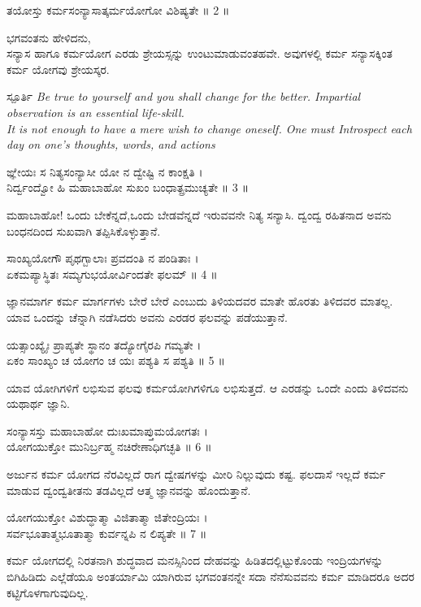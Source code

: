 ತಯೋಸ್ತು ಕರ್ಮಸಂನ್ಯಾಸಾತ್ಕರ್ಮಯೋಗೋ ವಿಶಿಷ್ಯತೇ ॥ 2 ॥
\begin{quoting}
ಭಗವಂತನು ಹೇಳಿದನು,\\
ಸನ್ಯಾಸ ಹಾಗೂ ಕರ್ಮಯೋಗ ಎರಡು ಶ್ರೇಯಸ್ಸನ್ನು ಉಂಟುಮಾಡುವಂತಹವೇ. ಅವುಗಳಲ್ಲಿ ಕರ್ಮ ಸನ್ಯಾಸಕ್ಕಿಂತ ಕರ್ಮ ಯೋಗವು ಶ್ರೇಯಸ್ಕರ.\\
\begin{inspiration}{\kanfont ಸ್ಪೂರ್ತಿ}
\small\it
Be true to yourself and you shall change for the better. Impartial observation is an essential life-skill.\\
It is not enough to have a mere wish to change oneself. One must Introspect each day on one’s thoughts, words, and actions
\end{inspiration}
\end{quoting}
ಙ್ಞೇಯಃ ಸ ನಿತ್ಯಸಂನ್ಯಾಸೀ ಯೋ ನ ದ್ವೇಷ್ಟಿ ನ ಕಾಂಕ್ಷತಿ ।\\
ನಿರ್ದ್ವಂದ್ವೋ ಹಿ ಮಹಾಬಾಹೋ ಸುಖಂ ಬಂಧಾತ್ಪ್ರಮುಚ್ಯತೇ ॥ 3 ॥
\begin{quoting}
ಮಹಾಬಾಹೋ! ಒಂದು ಬೇಕೆನ್ನದೆ,ಒಂದು ಬೇಡವೆನ್ನದೆ ಇರುವವನೇ ನಿತ್ಯ ಸನ್ಯಾಸಿ. ದ್ವಂದ್ವ ರಹಿತನಾದ ಅವನು ಬಂಧನದಿಂದ ಸುಖವಾಗಿ ತಪ್ಪಿಸಿಕೊಳ್ಳುತ್ತಾನೆ.\\
\end{quoting}
ಸಾಂಖ್ಯಯೋಗೌ ಪೃಥಗ್ಬಾಲಾಃ ಪ್ರವದಂತಿ ನ ಪಂಡಿತಾಃ ।\\
ಏಕಮಪ್ಯಾಸ್ಥಿತಃ ಸಮ್ಯಗುಭಯೋರ್ವಿಂದತೇ ಫಲಮ್ ॥ 4 ॥
\begin{quoting}
ಜ್ಞಾನಮಾರ್ಗ ಕರ್ಮ ಮಾರ್ಗಗಳು ಬೇರೆ ಬೇರೆ ಎಂಬುದು ತಿಳಿಯದವರ ಮಾತೇ ಹೊರತು ತಿಳಿದವರ ಮಾತಲ್ಲ. ಯಾವ ಒಂದನ್ನು ಚೆನ್ನಾಗಿ ನಡೆಸಿದರು ಅವನು ಎರಡರ ಫಲವನ್ನು ಪಡೆಯುತ್ತಾನೆ.\\
\end{quoting}
ಯತ್ಸಾಂಖ್ಯೈಃ ಪ್ರಾಪ್ಯತೇ ಸ್ಥಾನಂ ತದ್ಯೋಗೈರಪಿ ಗಮ್ಯತೇ ।\\
ಏಕಂ ಸಾಂಖ್ಯಂ ಚ ಯೋಗಂ ಚ ಯಃ ಪಶ್ಯತಿ ಸ ಪಶ್ಯತಿ ॥ 5 ॥
\begin{quoting}
ಯಾವ ಯೋಗಿಗಳಿಗೆ ಲಭಿಸುವ ಫಲವು ಕರ್ಮಯೋಗಿಗಳಿಗೂ ಲಭಿಸುತ್ತದೆ. ಆ ಎರಡನ್ನು ಒಂದೇ ಎಂದು ತಿಳಿದವನು ಯಥಾರ್ಥ ಜ್ಞಾನಿ.\\
\end{quoting}
ಸಂನ್ಯಾಸಸ್ತು ಮಹಾಬಾಹೋ ದುಃಖಮಾಪ್ತುಮಯೋಗತಃ ।\\
ಯೋಗಯುಕ್ತೋ ಮುನಿರ್ಬ್ರಹ್ಮ ನಚಿರೇಣಾಧಿಗಚ್ಛತಿ ॥ 6 ॥
\begin{quoting}
ಅರ್ಜುನ ಕರ್ಮ ಯೋಗದ ನೆರವಿಲ್ಲದೆ ರಾಗ ದ್ವೇಷಗಳನ್ನು ಮೀರಿ ನಿಲ್ಲುವುದು ಕಷ್ಟ. ಫಲದಾಸೆ ಇಲ್ಲದೆ ಕರ್ಮ ಮಾಡುವ ದ್ವಂದ್ವತೀತನು ತಡವಿಲ್ಲದೆ ಆತ್ಮ ಜ್ಞಾನವನ್ನು ಹೊಂದುತ್ತಾನೆ.\\
\end{quoting}
ಯೋಗಯುಕ್ತೋ ವಿಶುದ್ಧಾತ್ಮಾ ವಿಜಿತಾತ್ಮಾ ಜಿತೇಂದ್ರಿಯಃ ।\\
ಸರ್ವಭೂತಾತ್ಮಭೂತಾತ್ಮಾ ಕುರ್ವನ್ನಪಿ ನ ಲಿಪ್ಯತೇ ॥ 7 ॥
\begin{quoting}
 ಕರ್ಮ ಯೋಗದಲ್ಲಿ ನಿರತನಾಗಿ ಶುದ್ಧವಾದ ಮನಸ್ಸಿನಿಂದ ದೇಹವನ್ನು ಹಿಡಿತದಲ್ಲಿಟ್ಟುಕೊಂಡು ಇಂದ್ರಿಯಗಳನ್ನು ಬಿಗಿಹಿಡಿದು ಎಲ್ಲೆಡೆಯೂ ಅಂತರ್ಯಾಮಿ ಯಾಗಿರುವ ಭಗವಂತನನ್ನೇ ಸದಾ ನೆನೆಸುವವನು ಕರ್ಮ ಮಾಡಿದರೂ ಅದರ ಕಟ್ಟಿಗೊಳಗಾಗುವುದಿಲ್ಲ.\\
\end{quoting}
